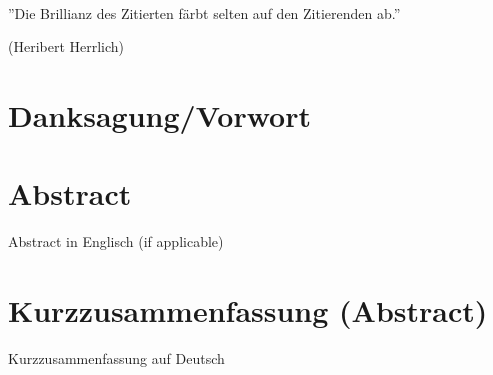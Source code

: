 \documentclass[
a4paper,
12pt,
titlepage,
bibliography=totoc,
twoside=on,
parskip = false,
numbers=noenddot,
cleardoublepage=empty,
DIV=12,
BCOR=12.0mm,
headings = openright,
]{scrreprt}
\begin{document}
\cleardoublepage

\thispagestyle{empty}

\begin{minipage}[c][\textheight][c]{0.97\textwidth} 
\begin{minipage}[c]{0.4\textwidth}
~
\end{minipage}
\begin{minipage}[c]{0.5\textwidth}
''Die Brillianz des Zitierten färbt selten auf den Zitierenden ab.''\par\noindent
(Heribert Herrlich)
\end{minipage}
\begin{minipage}[c]{0.1\textwidth}
\end{minipage}
\end{minipage}

\cleardoublepage


\chapter*{Danksagung/Vorwort}



\chapter*{Abstract}
Abstract in Englisch (if applicable)
%



\chapter*{Kurzzusammenfassung (Abstract)}
Kurzzusammenfassung auf Deutsch 
%


\end{document}
